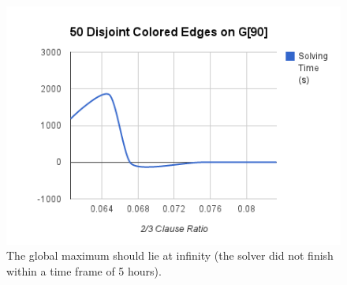 \documentclass[paper=a4, fontsize=11pt]{scrartcl} %
\begin{document}
\begin{figure}
\begin{center}
\includegraphics[scale=0.75]{chart_5.png}
\end{center}
\caption{The global maximum should lie at infinity (the solver did not finish within a time frame of 5 hours).} 
\label{f5}
\end{figure}


\end{document}
